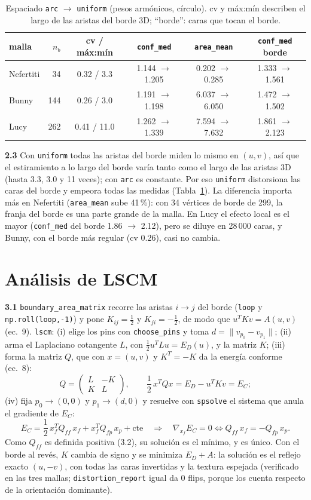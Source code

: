 \documentclass[
	spanish, %
	a4paper, oneside
]{article}
\newcommand{\code}[1]{\texttt{#1}}
\newcommand{\preg}[1]{\textbf{#1}\enspace}
\begin{document}
\begin{table}[h]
\centering\small
\caption{Espaciado \code{arc} $\to$ \code{uniform} (pesos armónicos, círculo). cv y máx:mín describen el largo de las aristas del borde 3D; ``borde'': caras que tocan el borde.}
\label{tab:arc}
\begin{tabular}{lrcccc}
\toprule
malla & $n_b$ & cv / máx:mín & \code{conf\_med} & \code{area\_mean} & \code{conf\_med} borde \\
\midrule
Nefertiti & 34 & 0.32 / 3.3 & 1.144 $\to$ 1.205 & 0.202 $\to$ 0.285 & 1.333 $\to$ 1.561 \\
Bunny & 144 & 0.26 / 3.0 & 1.191 $\to$ 1.198 & 6.037 $\to$ 6.050 & 1.472 $\to$ 1.502 \\
Lucy & 262 & 0.41 / 11.0 & 1.262 $\to$ 1.339 & 7.594 $\to$ 7.632 & 1.861 $\to$ 2.123 \\
\bottomrule
\end{tabular}
\end{table}

\preg{2.3} Con \code{uniform} todas las aristas del borde miden lo mismo en $(u,v)$, así que el estiramiento a lo largo del borde varía tanto como el largo de las aristas 3D (hasta 3.3, 3.0 y 11 veces); con \code{arc} es constante. Por eso \code{uniform} distorsiona las caras del borde y empeora todas las medidas (Tabla~\ref{tab:arc}). La diferencia importa más en Nefertiti (\code{area\_mean} sube 41\,\%): con 34 vértices de borde de 299, la franja del borde es una parte grande de la malla. En Lucy el efecto local es el mayor (\code{conf\_med} del borde 1.86 $\to$ 2.12), pero se diluye en 28\,000 caras, y Bunny, con el borde más regular (cv 0.26), casi no cambia.

\section{Análisis de LSCM}
\preg{3.1} \code{boundary\_area\_matrix} recorre las aristas $i\to j$ del borde (\code{loop} y \code{np.roll(loop,-1)}) y pone $K_{ij}=\tfrac12$ y $K_{ji}=-\tfrac12$, de modo que $u^TKv=A(u,v)$ (ec.~9). \code{lscm}: (i) elige los pins con \code{choose\_pins} y toma $d=\|v_{p_0}-v_{p_1}\|$; (ii) arma el Laplaciano cotangente $L$, con $\tfrac12u^TLu=E_D(u)$, y la matriz $K$; (iii) forma la matriz $Q$, que con $x=(u,v)$ y $K^T=-K$ da la energía conforme (ec.~8):
\[
Q=\begin{pmatrix}L&-K\\K&L\end{pmatrix},\qquad
\frac12\,x^TQx=E_D-u^TKv=E_C;
\]
(iv) fija $p_0\to(0,0)$ y $p_1\to(d,0)$ y resuelve con \code{spsolve} el sistema que anula el gradiente de $E_C$:
\[
E_C=\frac12\,x_f^TQ_{ff}\,x_f+x_f^TQ_{fp}\,x_p+\text{cte}
\quad\Longrightarrow\quad
\nabla_{x_f}E_C=0\iff Q_{ff}\,x_f=-Q_{fp}\,x_p.
\]
Como $Q_{ff}$ es definida positiva (3.2), su solución es el mínimo, y es único. Con el borde al revés, $K$ cambia de signo y se minimiza $E_D+A$: la solución es el reflejo exacto $(u,-v)$, con todas las caras invertidas y la textura espejada (verificado en las tres mallas; \code{distortion\_report} igual da 0 flips, porque los cuenta respecto de la orientación dominante).
\end{document}
